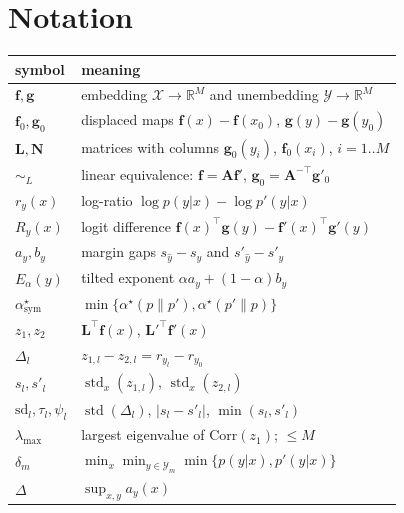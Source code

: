 \documentclass[10pt,letterpaper,twocolumn]{article}
\newcommand{\X}{\mathcal{X}}
\newcommand{\Y}{\mathcal{Y}}
\newcommand{\bff}{\mathbf{f}}
\newcommand{\bfg}{\mathbf{g}}
\newcommand{\bfL}{\mathbf{L}}
\newcommand{\bfN}{\mathbf{N}}
\newcommand{\simL}{\sim_{L}}
\theoremstyle{plain}
\theoremstyle{definition}
\theoremstyle{remark}
\begin{document}



\newpage
\appendix
\onecolumn

\section{Notation}
\label{app:notation}

\begin{center}\small
\begin{tabular}{@{}ll@{}}
\toprule
symbol & meaning \\
\midrule
$\bff,\bfg$ & embedding $\X\to\mathbb{R}^{M}$ and unembedding $\Y\to\mathbb{R}^{M}$ \\
$\bff_{0},\bfg_{0}$ & displaced maps $\bff(x)-\bff(x_{0})$, $\bfg(y)-\bfg(y_{0})$ \\
$\bfL,\bfN$ & matrices with columns $\bfg_{0}(y_{i})$, $\bff_{0}(x_{i})$, $i=1..M$ \\
$\simL$ & linear equivalence: $\bff=\mathbf{A}\bff'$, $\bfg_{0}=\mathbf{A}^{-\top}\bfg'_{0}$ \\
$r_{y}(x)$ & log-ratio $\log p(y|x)-\log p'(y|x)$ \\
$R_{y}(x)$ & logit difference $\bff(x)^{\top}\bfg(y)-\bff'(x)^{\top}\bfg'(y)$ \\
$a_{y},b_{y}$ & margin gaps $s_{\hat y}-s_{y}$ and $s'_{\hat y}-s'_{y}$ \\
$E_{\alpha}(y)$ & tilted exponent $\alpha a_{y}+(1-\alpha)b_{y}$ \\
$\alpha^{\star}_{\mathrm{sym}}$ & $\min\{\alpha^{\star}(p\|p'),\alpha^{\star}(p'\|p)\}$ \\
$z_{1},z_{2}$ & $\bfL^{\top}\bff(x)$, $\bfL'^{\top}\bff'(x)$ \\
$\Delta_{l}$ & $z_{1,l}-z_{2,l}=r_{y_{l}}-r_{y_{0}}$ \\
$s_{l},s'_{l}$ & $\operatorname{std}_{x}(z_{1,l})$, $\operatorname{std}_{x}(z_{2,l})$ \\
$\mathrm{sd}_{l},\tau_{l},\psi_{l}$ & $\operatorname{std}(\Delta_{l})$, $|s_{l}-s'_{l}|$, $\min(s_{l},s'_{l})$ \\
$\lambda_{\max}$ & largest eigenvalue of $\mathrm{Corr}(z_{1})$; $\le M$ \\
$\delta_{m}$ & $\min_{x}\min_{y\in\Y_{m}}\min\{p(y|x),p'(y|x)\}$ \\
$\Delta$ & $\sup_{x,y}a_{y}(x)$ \\
\bottomrule
\end{tabular}
\end{center}
\end{document}
